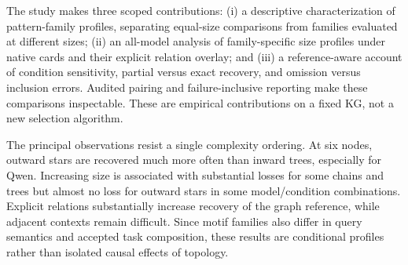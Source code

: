 The study makes three scoped contributions: (i) a descriptive characterization of pattern-family profiles, separating equal-size comparisons from families evaluated at different sizes; (ii) an all-model analysis of family-specific size profiles under native cards and their explicit relation overlay; and (iii) a reference-aware account of condition sensitivity, partial versus exact recovery, and omission versus inclusion errors. Audited pairing and failure-inclusive reporting make these comparisons inspectable. These are empirical contributions on a fixed KG, not a new selection algorithm.

The principal observations resist a single complexity ordering. At six nodes, outward stars are recovered much more often than inward trees, especially for Qwen. Increasing size is associated with substantial losses for some chains and trees but almost no loss for outward stars in some model/condition combinations. Explicit relations substantially increase recovery of the graph reference, while adjacent contexts remain difficult. Since motif families also differ in query semantics and accepted task composition, these results are conditional profiles rather than isolated causal effects of topology.

